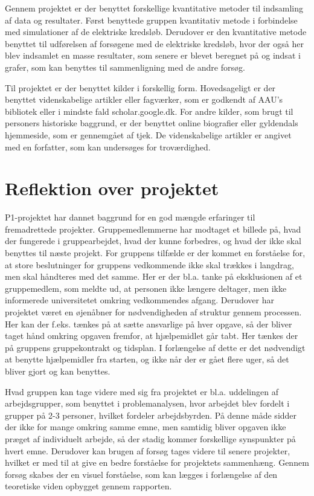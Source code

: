 Gennem projektet er der benyttet forskellige kvantitative metoder til indsamling af data og resultater. Først benyttede gruppen kvantitativ metode i forbindelse med simulationer af de elektriske kredsløb. Derudover er den kvantitative metode benyttet til udførelsen af forsøgene med de elektriske kredsløb, hvor der også her blev indsamlet en masse resultater, som senere er blevet beregnet på og indsat i grafer, som kan benyttes til sammenligning med de andre forsøg.

Til projektet er der benyttet kilder i forskellig form. Hovedsageligt er der benyttet videnskabelige artikler eller fagværker, som er godkendt af AAU's bibliotek eller i mindste fald scholar.google.dk. For andre kilder, som brugt til personers historiske baggrund, er der benyttet online biografier eller gyldendals hjemmeside, som er gennemgået af tjek. De videnskabelige artikler er angivet med en forfatter, som kan undersøges for troværdighed.

\newpage

\section{Reflektion over projektet}

P1-projektet har dannet baggrund for en god mængde erfaringer til fremadrettede projekter. Gruppemedlemmerne har modtaget et billede på, hvad der fungerede i gruppearbejdet, hvad der kunne forbedres, og hvad der ikke skal benyttes til næste projekt. For gruppens tilfælde er der kommet en forståelse for, at store beslutninger for gruppens vedkommende ikke skal trækkes i langdrag, men skal håndteres med det samme. Her er der bl.a. tanke på eksklusionen af et gruppemedlem, som meldte ud, at personen ikke længere deltager, men ikke informerede universitetet omkring vedkommendes afgang. Derudover har projektet været en øjenåbner for nødvendigheden af struktur gennem processen. Her kan der f.eks. tænkes på at sætte ansvarlige på hver opgave, så der bliver taget hånd omkring opgaven fremfor, at hjælpemidlet går tabt. Her tænkes der på gruppens gruppekontrakt og tidsplan. I forlængelse af dette er det nødvendigt at benytte hjælpemidler fra starten, og ikke når der er gået flere uger, så det bliver gjort og kan benyttes.

Hvad gruppen kan tage videre med sig fra projektet er bl.a. uddelingen af arbejdsgrupper, som benyttet i problemanalysen, hvor arbejdet blev fordelt i grupper på 2-3 personer, hvilket fordeler arbejdsbyrden. På denne måde sidder der ikke for mange omkring samme emne, men samtidig bliver opgaven ikke præget af individuelt arbejde, så der stadig kommer forskellige synspunkter på hvert emne. Derudover kan brugen af forsøg tages videre til senere projekter, hvilket er med til at give en bedre forståelse for projektets sammenhæng. Gennem forsøg skabes der en visuel forståelse, som kan lægges i forlængelse af den teoretiske viden opbygget gennem rapporten.

